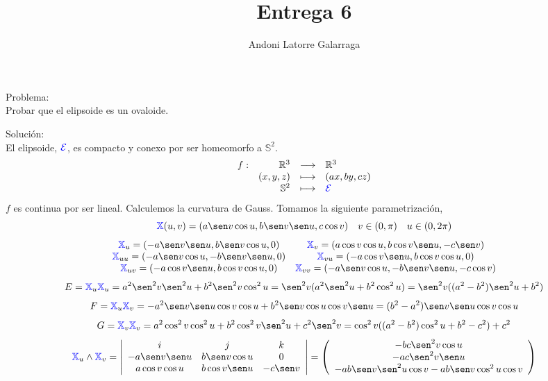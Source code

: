 \documentclass{article}
\title{Entrega 6}
\author{Andoni Latorre Galarraga}
\date{}
\newcommand{\bb}[1]{\mathbb{#1}}
\begin{document}
\maketitle

\textcolor{WildStrawberry}{Problema:}\\
Probar que el elipsoide es un ovaloide.

\textcolor{WildStrawberry}{Solución:}\\
El elipsoide, $\textcolor{blue}{\mathcal{E}}$, es compacto y conexo por ser homeomorfo a $\bb{S}^2$.
$$
\begin{array}{crcl}
f : & \bb{R}^3 & \longrightarrow & \bb{R}^3 \\
& (x,y,z) & \longmapsto & (ax, by, cz) \\
& \bb{S}^2 & \longmapsto & \textcolor{blue}{\mathcal{E}}
\end{array}
$$
$f$ es continua por ser lineal. Calculemos la curvatura de Gauss. Tomamos la siguiente parametrización,
$$
\textcolor{blue}{\bb{X}}(u,v) = (a \sen v \cos u, b \sen v \sen u, c \cos v) \quad v\in (0, \pi) \quad u\in(0, 2\pi)
$$
$$
\begin{array}{cc}
    \textcolor{blue}{\bb{X}}_u = (-a \sen v \sen u, b \sen v \cos u, 0) & \textcolor{blue}{\bb{X}}_v = (a \cos v \cos u, b \cos v \sen u, -c \sen v) \\
    \textcolor{blue}{\bb{X}}_{uu} = (-a \sen v \cos u, -b \sen v \sen u, 0) & \textcolor{blue}{\bb{X}}_{vu} = (-a \cos v \sen u, b \cos v \cos u, 0) \\
    \textcolor{blue}{\bb{X}}_{uv} = (-a \cos v \sen u, b \cos v \cos u, 0) & \textcolor{blue}{\bb{X}}_{vv} = (-a \sen v \cos u, -b \sen v \sen u, -c \cos v)
\end{array}
$$
$$
E = \textcolor{blue}{\bb{X}}_u \textcolor{blue}{\bb{X}}_u = a^2 \sen^2 v \sen^2 u + b^2 \sen^2 v \cos^2 u = \sen^2 v (a^2 \sen^2 u + b^2 \cos^2 u) = \sen^2 v ((a^2-b^2)\sen^2 u + b^2)
$$
$$
F = \textcolor{blue}{\bb{X}}_u \textcolor{blue}{\bb{X}}_v = - a^2 \sen v \sen u \cos v \cos u + b^2 \sen v \cos u \cos v \sen u = (b^2 - a^2) \sen v \sen u \cos v \cos u
$$
$$
G = \textcolor{blue}{\bb{X}}_v \textcolor{blue}{\bb{X}}_v = a^2 \cos^2 v \cos^2 u + b^2 \cos^2 v \sen^2 u + c^2 \sen^2 v = \cos^2 v ((a^2-b^2) \cos^2 u + b^2 - c^2) + c^2
$$
$$
\textcolor{blue}{\bb{X}}_u \land \textcolor{blue}{\bb{X}}_v =
\left|\begin{array}{ccc}
    i & j & k \\
    -a \sen v \sen u & b \sen v \cos u & 0 \\
    a \cos v \cos u & b \cos v \sen u & -c \sen v    
\end{array}\right| =
\left(\begin{array}{c}
-bc \sen^2 v \cos u \\
-ac \sen^2 v \sen u \\
-ab \sen v \sen^2 u \cos v - ab \sen v \cos^2 u \cos v
\end{array}\right)
$$
\end{document}
